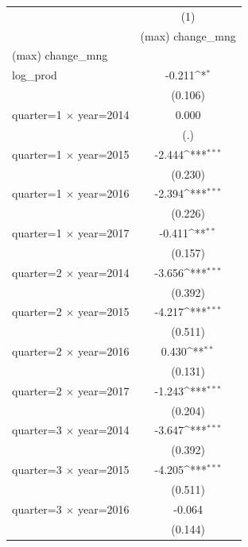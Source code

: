 {
\def\sym#1{\ifmmode^{#1}\else\(^{#1}\)\fi}
\begin{tabular}{l*{1}{c}}
\hline\hline
                    &\multicolumn{1}{c}{(1)}\\
                    &\multicolumn{1}{c}{(max) change\_mng}\\
\hline
(max) change\_mng    &                     \\
log\_prod            &      -0.211\sym{*}  \\
                    &     (0.106)         \\
[1em]
quarter=1 $\times$ year=2014&       0.000         \\
                    &         (.)         \\
[1em]
quarter=1 $\times$ year=2015&      -2.444\sym{***}\\
                    &     (0.230)         \\
[1em]
quarter=1 $\times$ year=2016&      -2.394\sym{***}\\
                    &     (0.226)         \\
[1em]
quarter=1 $\times$ year=2017&      -0.411\sym{**} \\
                    &     (0.157)         \\
[1em]
quarter=2 $\times$ year=2014&      -3.656\sym{***}\\
                    &     (0.392)         \\
[1em]
quarter=2 $\times$ year=2015&      -4.217\sym{***}\\
                    &     (0.511)         \\
[1em]
quarter=2 $\times$ year=2016&       0.430\sym{**} \\
                    &     (0.131)         \\
[1em]
quarter=2 $\times$ year=2017&      -1.243\sym{***}\\
                    &     (0.204)         \\
[1em]
quarter=3 $\times$ year=2014&      -3.647\sym{***}\\
                    &     (0.392)         \\
[1em]
quarter=3 $\times$ year=2015&      -4.205\sym{***}\\
                    &     (0.511)         \\
[1em]
quarter=3 $\times$ year=2016&      -0.064         \\
                    &     (0.144)         \\

\end{tabular}}
